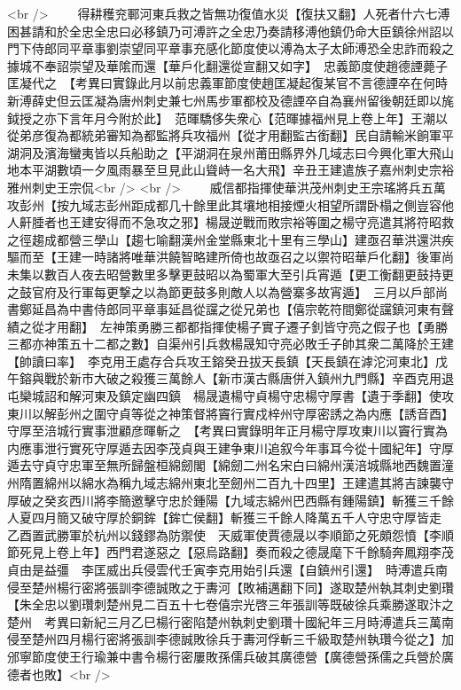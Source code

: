 <br />
　　得耕穫兖鄆河東兵救之皆無功復值水災【復扶又翻】人死者什六七溥困甚請和於全忠全忠曰必移鎮乃可溥許之全忠乃奏請移溥他鎮仍命大臣鎮徐州詔以門下侍郎同平章事劉崇望同平章事充感化節度使以溥為太子太師溥恐全忠詐而殺之據城不奉詔崇望及華隂而還【華戶化翻還從宣翻又如字】　忠義節度使趙德諲薨子匡凝代之　【考異曰實錄此月以前忠義軍節度使趙匡凝起復某官不言德諲卒在何時新溥薛史但云匡凝為唐州刺史兼七州馬步軍都校及德諲卒自為襄州留後朝廷即以旄鉞授之亦下言年月今附於此】　范暉驕侈失衆心【范暉據福州見上卷上年】王潮以從弟彦復為都統弟審知為都監將兵攻福州【從才用翻監古銜翻】民自請輸米餉軍平湖洞及濱海蠻夷皆以兵船助之【平湖洞在泉州莆田縣界外几域志曰今興化軍大飛山地本平湖數頃一夕風雨暴至旦見此山聳峙一名大飛】辛丑王建遣族子嘉州刺史宗裕雅州刺史王宗侃<br />
<br />
　　威信都指揮使華洪茂州刺史王宗瑤將兵五萬攻彭州【按九域志彭州距成都几十餘里此其壤地相接煙火相望所謂卧榻之側豈容他人鼾腄者也王建安得而不急攻之邪】楊晟逆戰而敗宗裕等圍之楊守亮遣其將符昭救之徑趨成都營三學山【趨七喻翻漢州金堂縣東北十里有三學山】建亟召華洪還洪疾驅而至【王建一時諸將唯華洪饒智略建所倚也故亟召之以禦符昭華戶化翻】後軍尚未集以數百人夜去昭營數里多擊更鼓昭以為蜀軍大至引兵宵遁【更工衡翻更鼓持更之鼓官府及行軍每更撃之以為節更鼓多則敵人以為營寨多故宵遁】　三月以戶部尚書鄭延昌為中書侍郎同平章事延昌從讜之從兄弟也【僖宗乾符間鄭從讜鎮河東有聲績之從才用翻】　左神策勇勝三都都指揮使楊子實子遷子釗皆守亮之假子也【勇勝三都亦神策五十二都之數】自渠州引兵救楊晟知守亮必敗壬子帥其衆二萬降於王建【帥讀曰率】　李克用王處存合兵攻王鎔癸丑拔天長鎮【天長鎮在滹沱河東北】戊午鎔與戰於新市大破之殺獲三萬餘人【新市漢古縣唐併入鎮州九門縣】辛酉克用退屯欒城詔和解河東及鎮定幽四鎮　楊晟遺楊守貞楊守忠楊守厚書【遺于季翻】使攻東川以解彭州之圍守貞等從之神策督將竇行實戍梓州守厚密誘之為内應【誘音酉】守厚至涪城行實事泄顧彦暉斬之　【考異曰實錄明年正月楊守厚攻東川以竇行實為内應事泄行實死守厚遁去因李茂貞與王建争東川追叙今年事耳今從十國紀年】守厚遁去守貞守忠軍至無所歸盤桓綿劒閣【綿劒二州名宋白曰綿州漢涪城縣地西魏置潼州隋置綿州以綿水為稱九域志綿州東北至劒州二百九十四里】王建遣其將吉諫襲守厚破之癸亥西川將李簡邀擊守忠於鍾陽【九域志綿州巴西縣有鍾陽鎮】斬獲三千餘人夏四月簡又破守厚於銅鉾【鉾亡侯翻】斬獲三千餘人降萬五千人守忠守厚皆走　乙酉置武勝軍於杭州以錢鏐為防禦使　天威軍使賈德晟以李順節之死頗怨憤【李順節死見上卷上年】西門君遂惡之【惡烏路翻】奏而殺之德晟麾下千餘騎奔鳳翔李茂貞由是益彊　李匡威出兵侵雲代壬寅李克用始引兵還【自鎮州引還】　時溥遣兵南侵至楚州楊行密將張訓李德誠敗之于夀河【敗補邁翻下同】遂取楚州執其刺史劉瓚【朱全忠以劉瓚刺楚州見二百五十七卷僖宗光啓三年張訓等既破徐兵乘勝遂取汴之楚州　考異曰新紀三月乙巳楊行密陷楚州執刺史劉瓚十國紀年三月時溥遣兵三萬南侵至楚州四月楊行密將張訓李德誠敗徐兵于夀河俘斬三千級取楚州執瓚今從之】加邠寧節度使王行瑜兼中書令楊行密屢敗孫儒兵破其廣德營【廣德營孫儒之兵營於廣德者也敗】<br />
